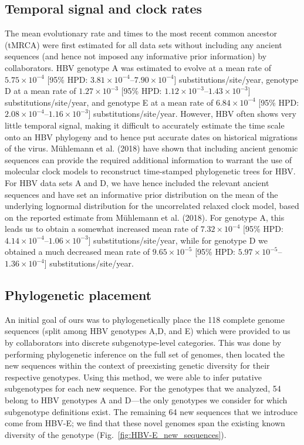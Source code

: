 \subsection{Temporal signal and clock rates}

The mean evolutionary rate and times to the most recent common ancestor (tMRCA) were first estimated for all data sets without including any ancient sequences (and hence not imposed any informative prior information) by collaborators.
HBV genotype A was estimated to evolve at a mean rate of $5.75\times10^{-4}$ [95\% HPD: $3.81\times10^{-4}$--$7.90\times10^{-4}$] substitutions/site/year, genotype D at a mean rate of $1.27\times10^{-3}$ [95\% HPD: $1.12\times10^{-3}$--$1.43\times10^{-3}$] substitutions/site/year, and genotype E at a mean rate of $6.84\times10^{-4}$ [95\% HPD: $2.08\times10^{-4}$--$1.16\times10^{-3}$] substitutions/site/year.
However, HBV often shows very little temporal signal, making it difficult to accurately estimate the time scale onto an HBV phylogeny and to hence put accurate dates on historical migrations of the virus.
M{\"u}hlemann et al. (2018) have shown that including ancient genomic sequences can provide the required additional information to warrant the use of molecular clock models to reconstruct time-stamped phylogenetic trees for HBV.
For HBV data sets A and D, we have hence included the relevant ancient sequences and have set an informative prior distribution on the mean of the underlying lognormal distribution for the uncorrelated relaxed clock model, based on the reported estimate from M{\"u}hlemann et al. (2018).
For genotype A, this leads us to obtain a somewhat increased mean rate of $7.32\times10^{-4}$ [95\% HPD: $4.14\times10^{-4}$--$1.06\times10^{-3}$] substitutions/site/year, while for genotype D we obtained a much decreased mean rate of $9.65\times10^{-5}$ [95\% HPD: $5.97\times10^{-5}$--$1.36\times10^{-4}$] substitutions/site/year.

\subsection{Phylogenetic placement}

An initial goal of ours was to phylogenetically place the 118 complete genome sequences (split among HBV genotypes A,D, and E) which were provided to us by collaborators into discrete subgenotype-level categories.
This was done by performing phylogenetic inference on the full set of genomes, then located the new sequences within the context of preexisting genetic diversity for their respective genotypes.
Using this method, we were able to infer putative subgenotypes for each new sequence.
For the genotypes that we analyzed, 54 belong to HBV genotypes A and D---the only genotypes we consider for which subgenotype definitions exist.
The remaining 64 new sequences that we introduce come from HBV-E; we find that these novel genomes span the existing known diversity of the genotype (Fig.~\ref{fig:HBV-E_new_sequences}).

